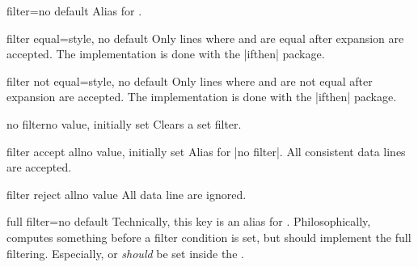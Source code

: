 \documentclass[a4paper,11pt]{ltxdoc}
\begin{document}
\begin{docCsvKey}{filter}{=}{no default}
  Alias for .
\end{docCsvKey}

\begin{docCsvKey}{filter equal}{=}{style, no default}
  Only lines where  and  are equal after expansion
  are accepted.
  The implementation is done with the |ifthen| package.
\end{docCsvKey}


\begin{docCsvKey}{filter not equal}{=}{style, no default}
  Only lines where  and  are not equal after expansion
  are accepted.
  The implementation is done with the |ifthen| package.
\end{docCsvKey}



\begin{docCsvKey}{no filter}{}{no value, initially set}
  Clears a set filter.
\end{docCsvKey}


\begin{docCsvKey}{filter accept all}{}{no value, initially set}
  Alias for |no filter|. All consistent data lines are accepted.
\end{docCsvKey}


\begin{docCsvKey}{filter reject all}{}{no value}
  All data line are ignored.
\end{docCsvKey}



\enlargethispage*{2cm}
\begin{docCsvKey}[][doc new=2016-07-01]{full filter}{=}{no default}
  Technically, this key is an alias for .
  Philosophically,  computes something before
  a filter condition is set, but  should implement
  the full filtering. Especially,  or
   \emph{should} be set inside the .
\begin{dispExample}
\end{dispExample}
\end{docCsvKey}
\end{document}
